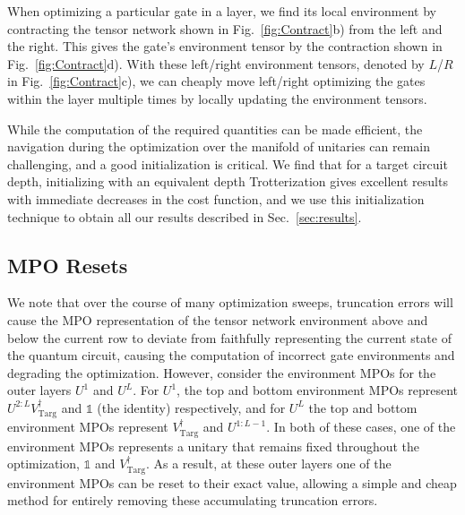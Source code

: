 \documentclass[a4paper,twocolumn,11pt,accepted=2025-06-10]{quantumarticle}
\begin{document}
When optimizing a particular gate in a layer, we find its local environment by contracting the tensor network shown in Fig.~\ref{fig:Contract}b) from the left and the right. This gives the gate's environment tensor by the contraction shown in Fig.~\ref{fig:Contract}d). With these left/right environment tensors, denoted by $L$/$R$ in Fig.~\ref{fig:Contract}c), we can cheaply move left/right optimizing the gates within the layer multiple times by locally updating the environment tensors.

While the computation of the required quantities can be made efficient, the navigation during the optimization over the manifold of unitaries can remain challenging, and a good initialization is critical. We find that for a target circuit depth, initializing with an equivalent depth Trotterization gives excellent results with immediate decreases in the cost function, and we use this initialization technique to obtain all our results described in Sec.~\ref{sec:results}.

\subsection{MPO Resets}

We note that over the course of many optimization sweeps, truncation errors will cause the MPO representation of the tensor network environment above and below the current row to deviate from faithfully representing the current state of the quantum circuit, causing the computation of incorrect gate environments and degrading the optimization. However, consider the environment MPOs for the outer layers $U^1$ and $U^L$. For $U^1$, the top and bottom environment MPOs represent $U^{2:L} V_{\text{Targ}}^{\dagger}$ and $\mathds{1}$ (the identity) respectively, and for $U^L$ the top and bottom environment MPOs represent $V_{\text{Targ}}^{\dagger}$ and $U^{1:L-1}$. In both of these cases, one of the environment MPOs represents a unitary that remains fixed throughout the optimization, $\mathds{1}$ and $V_{\text{Targ}}^{\dagger}$. As a result, at these outer layers one of the environment MPOs can be reset to their exact value, allowing a simple and cheap method for entirely removing these accumulating truncation errors.
\end{document}
